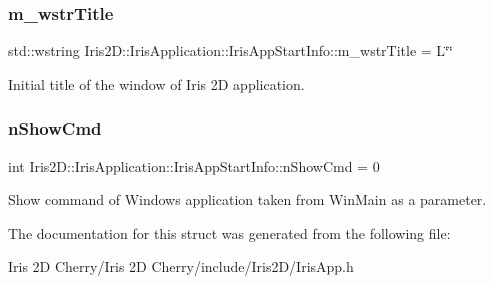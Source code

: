\subsubsection{\texorpdfstring{m\+\_\+wstr\+Title}{m\_wstrTitle}}
{\footnotesize\ttfamily std\+::wstring Iris2\+D\+::\+Iris\+Application\+::\+Iris\+App\+Start\+Info\+::m\+\_\+wstr\+Title = L\char`\"{}\char`\"{}}



Initial title of the window of Iris 2D application. 

\mbox{\label{struct_iris2_d_1_1_iris_application_1_1_iris_app_start_info_a45353664bb0d0719cb06eb7763263d7d}} 
\subsubsection{\texorpdfstring{n\+Show\+Cmd}{nShowCmd}}
{\footnotesize\ttfamily int Iris2\+D\+::\+Iris\+Application\+::\+Iris\+App\+Start\+Info\+::n\+Show\+Cmd = 0}



Show command of Windows application taken from Win\+Main as a parameter. 



The documentation for this struct was generated from the following file\+:\begin{DoxyCompactItemize}
\item 
Iris 2\+D Cherry/\+Iris 2\+D Cherry/include/\+Iris2\+D/Iris\+App.\+h\end{DoxyCompactItemize}
